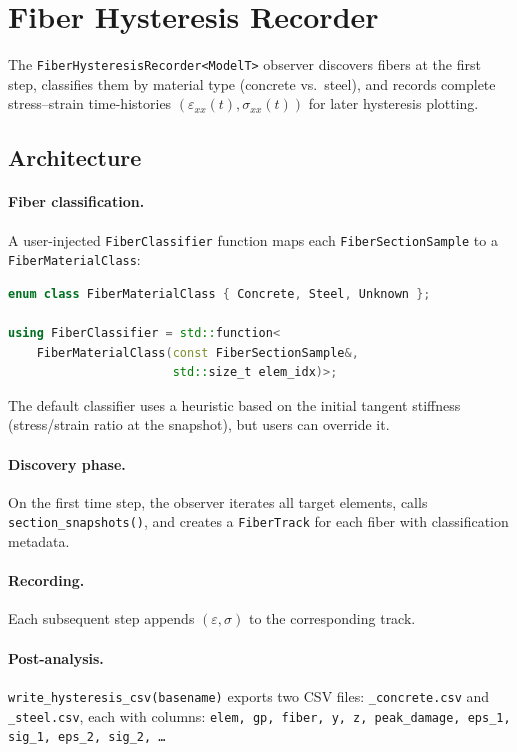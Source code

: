 \section{Fiber Hysteresis Recorder}
\label{sec:seismic-fiber-hysteresis}

The \texttt{FiberHysteresisRecorder<ModelT>} observer discovers
fibers at the first step, classifies them by material type
(concrete vs.\ steel), and records complete stress--strain
time-histories $(\varepsilon_{xx}(t), \sigma_{xx}(t))$ for later
hysteresis plotting.

\subsection{Architecture}

\paragraph{Fiber classification.}
A user-injected \texttt{FiberClassifier} function maps each
\texttt{FiberSectionSample} to a \texttt{FiberMaterialClass}:
%
\begin{lstlisting}[language=C++,basicstyle=\ttfamily\small]
enum class FiberMaterialClass { Concrete, Steel, Unknown };

using FiberClassifier = std::function<
    FiberMaterialClass(const FiberSectionSample&,
                       std::size_t elem_idx)>;
\end{lstlisting}
%
The default classifier uses a heuristic based on the initial
tangent stiffness (stress/strain ratio at the snapshot), but
users can override it.

\paragraph{Discovery phase.}
On the first time step, the observer iterates all target elements,
calls \texttt{section\_snapshots()}, and creates a
\texttt{FiberTrack} for each fiber with classification metadata.

\paragraph{Recording.}
Each subsequent step appends $(\varepsilon, \sigma)$ to the
corresponding track.

\paragraph{Post-analysis.}
\texttt{write\_hysteresis\_csv(basename)} exports two CSV files:
\texttt{\_concrete.csv} and \texttt{\_steel.csv}, each with columns:
\texttt{elem, gp, fiber, y, z, peak\_damage, eps\_1, sig\_1,
eps\_2, sig\_2, \ldots}


